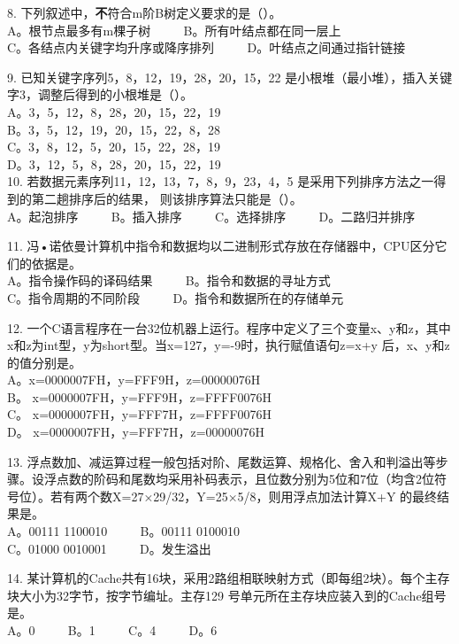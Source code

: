 8. 下列叙述中，\textbf{不}符合m阶B树定义要求的是（）。 \\
A。根节点最多有m棵子树 $\qquad$ B。所有叶结点都在同一层上 \\
C。各结点内关键字均升序或降序排列 $\qquad$ D。叶结点之间通过指针链接

9. 已知关键字序列5，8，12，19，28，20，15，22 是小根堆（最小堆），插入关键字3，调整后得到的小根堆是（）。 \\
A。3，5，12，8，28，20，15，22，19 \\
B。3，5，12，19，20，15，22，8，28 \\
C。3，8，12，5，20，15，22，28，19 \\
D。3，12，5，8，28，20，15，22，19 \\

10. 若数据元素序列11，12，13，7，8，9，23，4，5 是采用下列排序方法之一得到的第二趟排序后的结果，
则该排序算法只能是（）。 \\
A。起泡排序 $\qquad$ B。插入排序 $\qquad$ C。选择排序 $\qquad$ D。二路归并排序

11. 冯•诺依曼计算机中指令和数据均以二进制形式存放在存储器中，CPU区分它们的依据是。 \\
A。指令操作码的译码结果 $\qquad$ B。指令和数据的寻址方式 \\
C。指令周期的不同阶段 $\qquad$ D。指令和数据所在的存储单元

12. 一个C语言程序在一台32位机器上运行。程序中定义了三个变量x、y和z，其中x和z为int型，y为short型。当x=127，y=-9时，执行赋值语句z=x+y 后，x、y和z的值分别是。 \\
A。x=0000007FH，y=FFF9H，z=00000076H \\
B。 x=0000007FH，y=FFF9H，z=FFFF0076H \\
C。 x=0000007FH，y=FFF7H，z=FFFF0076H \\
D。 x=0000007FH，y=FFF7H，z=00000076H

13. 浮点数加、减运算过程一般包括对阶、尾数运算、规格化、舍入和判溢出等步骤。设浮点数的阶码和尾数均采用补码表示，且位数分别为5位和7位（均含2位符号位）。若有两个数X=27×29/32，Y=25×5/8，则用浮点加法计算X+Y 的最终结果是。 \\
A。00111 1100010 $\qquad$ B。00111 0100010 \\
C。01000 0010001 $\qquad$ D。发生溢出

14. 某计算机的Cache共有16块，采用2路组相联映射方式（即每组2块）。每个主存块大小为32字节，按字节编址。主存129 号单元所在主存块应装入到的Cache组号是。 \\
A。0 $\qquad$ B。1 $\qquad$ C。4 $\qquad$ D。6

